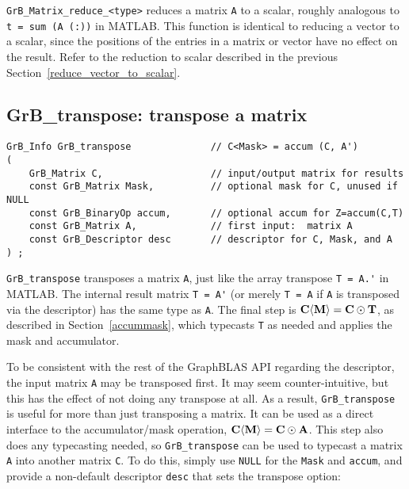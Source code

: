 \documentclass[12pt]{article}
\begin{document}
\verb'GrB_Matrix_reduce_<type>' reduces a matrix \verb'A' to a scalar, roughly
analogous to \verb't = sum (A (:))' in MATLAB.  This function is identical to
reducing a vector to a scalar, since the positions of the entries in a matrix
or vector have no effect on the result.  Refer to the reduction to scalar
described in the previous Section~\ref{reduce_vector_to_scalar}.

\newpage
\subsection{{\sf GrB\_transpose:} transpose a matrix} %
\label{transpose}

\begin{mdframed}[userdefinedwidth=6in]
{\footnotesize
\begin{verbatim}
GrB_Info GrB_transpose              // C<Mask> = accum (C, A')
(
    GrB_Matrix C,                   // input/output matrix for results
    const GrB_Matrix Mask,          // optional mask for C, unused if NULL
    const GrB_BinaryOp accum,       // optional accum for Z=accum(C,T)
    const GrB_Matrix A,             // first input:  matrix A
    const GrB_Descriptor desc       // descriptor for C, Mask, and A
) ;
\end{verbatim} } \end{mdframed}

\verb'GrB_transpose'
transposes a matrix \verb'A', just like the array transpose \verb"T = A.'" in
MATLAB.  The internal result matrix \verb"T = A'" (or merely \verb"T = A" if
\verb'A' is transposed via the descriptor) has the same type as \verb'A'.  The
final step is ${\bf C \langle M \rangle  = C \odot T}$, as described in
Section~\ref{accummask}, which typecasts \verb'T' as needed and applies the
mask and accumulator.

To be consistent with the rest of the GraphBLAS API regarding the
descriptor, the input matrix \verb'A' may be transposed first.  It may seem
counter-intuitive, but this has the effect of not doing any transpose at all.
As a result, \verb'GrB_transpose' is useful for more than just transposing a
matrix.  It can be used as a direct interface to the accumulator/mask
operation, ${\bf C \langle M \rangle  = C \odot A}$.  This step also does any
typecasting needed, so \verb'GrB_transpose' can be used to typecast a matrix
\verb'A' into another matrix \verb'C'.  To do this, simply use \verb'NULL' for
the \verb'Mask' and \verb'accum', and provide a non-default descriptor
\verb'desc' that sets the transpose option:
\end{document}
